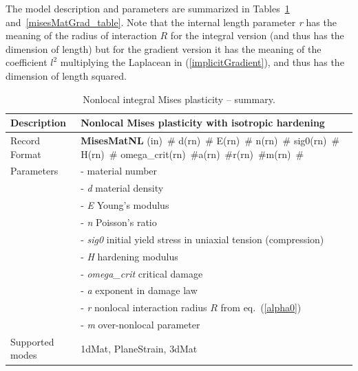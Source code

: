 \documentclass[a4paper]{article}
\newcommand{\descitem}[1]{{\noindent \bf #1}}
\newcommand{\elemparam}[2]{{{#1\tiny (#2)}~\#}}
\newcommand{\param}[1]{{\it #1}}
\begin{document}
The model description and parameters are summarized in Tables~\ref{misesMatNl_table} and~\ref{misesMatGrad_table}. Note that the internal length parameter \param{r} has the meaning of the
radius of interaction $R$ for the integral version (and thus has the dimension
of length) but for the gradient version it has the meaning of the coefficient $l^2$
multiplying the Laplacean in (\ref{implicitGradient}), and thus has the dimension of length squared.
\begin{table}[!htb]
\begin{tabular}{|l|p{9cm}|}
\hline
Description & Nonlocal Mises plasticity with isotropic hardening\\
\hline
Record Format & \descitem{MisesMatNL} \elemparam{}{in} \elemparam{d}{rn} \elemparam{E}{rn} \elemparam{n}{rn} 
\elemparam{sig0}{rn} \elemparam{H}{rn} \elemparam{omega\_crit}{rn}\elemparam{a}{rn}\elemparam{r}{rn}\elemparam{m}{rn} \\
Parameters &- \param{} material number\\
&- \param{d} material density\\
&- \param{E} Young's modulus\\
&- \param{n} Poisson's ratio\\
&- \param{sig0} initial yield stress in uniaxial tension (compression)\\
&- \param{H} hardening modulus\\
&- \param{omega\_crit} critical damage\\
&- \param{a} exponent in damage law\\
&- \param{r} nonlocal interaction radius $R$  from eq.~(\ref{alpha0})\\
&- \param{m} over-nonlocal parameter\\
Supported modes& 1dMat, PlaneStrain, 3dMat\\
\hline
\end{tabular}
\caption{Nonlocal integral Mises plasticity -- summary.}
\label{misesMatNl_table}
\end{table}
\end{document}
